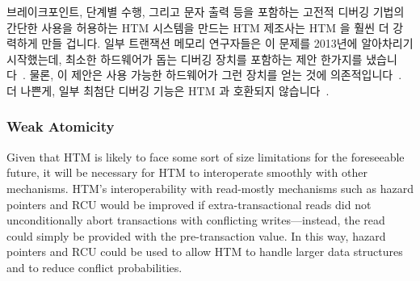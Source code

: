 브레이크포인트, 단계별 수행, 그리고 문자 출력 등을 포함하는 고전적 디버깅
기법의 간단한 사용을 허용하는 HTM 시스템을 만드는 HTM 제조사는 HTM 을 훨씬 더
강력하게 만들 겁니다.
일부 트랜잭션 메모리 연구자들은 이 문제를 2013년에 알아차리기 시작했는데,
최소한 하드웨어가 돕는 디버깅 장치를 포함하는 제안 한가지를
냈습니다~\cite{JustinGottschlich2013TMdebug}.
물론, 이 제안은 사용 가능한 하드웨어가 그런 장치를 얻는 것에
의존적입니다~\cite{TimothyHayes2020ARM-HTM,Intel2020TSXdevguide}.
더 나쁜게, 일부 최첨단 디버깅 기능은 HTM 과 호환되지
않습니다~\cite{RobertOCallahan2020DebuggingHTM}.

\iffalse

Another inhibitor to transaction size is the need to debug the transactions.
The problem with current mechanisms is that a single-step exception
aborts the enclosing transaction.
There are a number of workarounds for this issue, including emulating
the processor (slow!), substituting STM for HTM (slow and slightly
different semantics!),
playback techniques using repeated retries to emulate forward
progress (strange failure modes!), and
full support of debugging HTM transactions (complex!).

Should one of the HTM vendors produce an HTM system that allows
straightforward use of classical debugging techniques within
transactions, including breakpoints, single stepping, and
print statements, this will make HTM much more compelling.
Some transactional-memory researchers started to recognize this
problem in 2013, with at least one proposal involving hardware-assisted
debugging facilities~\cite{JustinGottschlich2013TMdebug}.
Of course, this proposal depends on readily available hardware gaining such
facilities~\cite{TimothyHayes2020ARM-HTM,Intel2020TSXdevguide}.
Worse yet, some cutting-edge debugging facilities are incompatible
with HTM~\cite{RobertOCallahan2020DebuggingHTM}.

\fi

\subsubsection{Weak Atomicity}
\label{sec:future:Weak Atomicity}

Given that HTM is likely to face some sort of size limitations for the
foreseeable future, it will be necessary for HTM to interoperate
smoothly with other mechanisms.
HTM's interoperability with read-mostly mechanisms such as hazard pointers
and RCU would be improved if extra-transactional reads did not
unconditionally abort transactions with conflicting writes---instead,
the read could simply be provided with the pre-transaction value.
In this way, hazard pointers and RCU could be used to allow HTM to handle
larger data structures and to reduce conflict probabilities.


